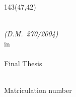   \begin{textblock}{143}(47,42)

  \\
  \emph{\LARGE{}(D.M.~270/2004)}\\
  {\LARGE{}in \myDegree}\\
  \\
  {\LARGE{}Final Thesis}{\LARGE \par}

  \vspace{80pt}


  \noindent %
  \begin{minipage}[t]{1\columnwidth}%
  \leavevmode
  \titleColor
  \raggedright
  \Huge
  \myTitle
  \end{minipage}

  \vspace{100pt}



  \vspace{20pt}


  \noindent {\large{}\myName}\\
  {\large{}Matriculation number \myStudentNumber}{\large \par}

  \vspace{20pt}


  \noindent {\large{}\myAcademicYear}{\large \par}

  \end{textblock}
\endgroup
